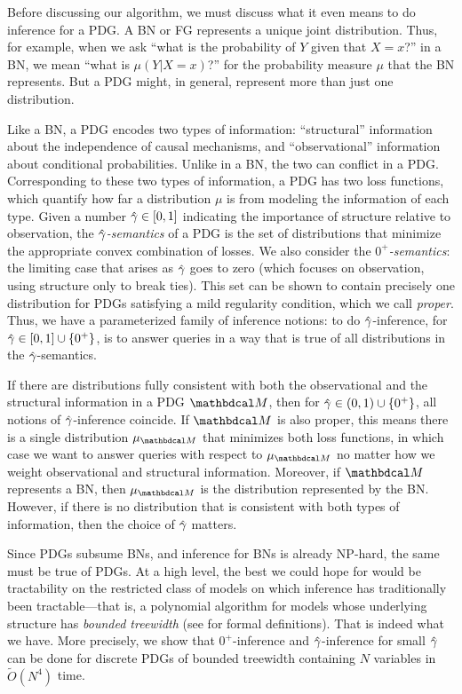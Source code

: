 Before discussing our algorithm, 
we must discuss what it even means to do inference for a PDG.  
A BN or FG represents 
a unique joint distribution. 
Thus, for example, when we ask ``what is the probability of $Y$ given that $X{=}x$?''
\def\BNPr{\mu}
in a BN, we mean ``what is $\BNPr(Y | X{=}x)$?'' for the probability 
measure $\BNPr$ that the BN represents.
But a PDG might, in general, represent more than just one distribution.

Like a BN, a PDG encodes
two types of information: ``structural'' 
information about the independence of causal mechanisms,
and ``observational'' information
about conditional probabilities.
Unlike in a BN, the two can conflict in a PDG.
Corresponding to these two types of information,
a PDG has two loss functions,
which quantify how far a distribution $\mu$ is from
modeling the information of each type.
Given a number $\zogamma
\in [0,1]
$
indicating the importance of structure relative to observation,
the \emph{$\zogamma$-semantics} of a PDG is the
set of distributions that minimize 
the appropriate convex combination of
losses.
We also consider the \emph{$0^+$\!-semantics}: the limiting case that
arises as $\zogamma$ goes to zero
(which focuses
 on observation, using structure only to break ties).
This set
can be shown to contain precisely one distribution
for PDGs satisfying a mild regularity condition,
which we call \emph{proper}. 
Thus, we have
 a parameterized family of inference notions:
to do $\zogamma$-inference, for $\zogamma \in [0,1] \cup \{0^+\}$,
is to answer queries in a way that is true of all distributions in the $\zogamma$-semantics.

If there are distributions
fully
consistent with
both the observational and the structural information
in a PDG $\dg M$, 
then for $\zogamma \in (0,1) \cup \{0^+\}$, all
notions of $\zogamma$-inference 
coincide.
\def\PrM{\mu_{\dg M}}%
If $\dg M$ is also proper,
    this means there is
    a single distribution $\PrM$
    that minimizes both loss functions, 
    in which case we want to answer queries with respect to $\PrM$
    no matter how we weight observational and structural information. 
Moreover, if $\dg M$ represents a BN,
then $\PrM$ is the distribution represented by the BN.  
However, if there is no distribution that is consistent with both types of information, then the choice of $\zogamma$ matters.  

Since PDGs subsume BNs, and inference for BNs is already NP-hard, the same must be true of PDGs.
At a high level, the best we could hope for would be tractability on the restricted
class of models on which inference has traditionally been tractable---that is, a polynomial algorithm for models whose
underlying structure has \emph{bounded treewidth} (see
 for formal definitions).
That is indeed what we have.  
More precisely, we show that
$0^+$\!-inference
and $\zogamma$-inference for small $\zogamma$ 
can be done 
for discrete PDGs of bounded treewidth containing $N$ variables in
$\tilde O(N^4)$ 
time.
 
